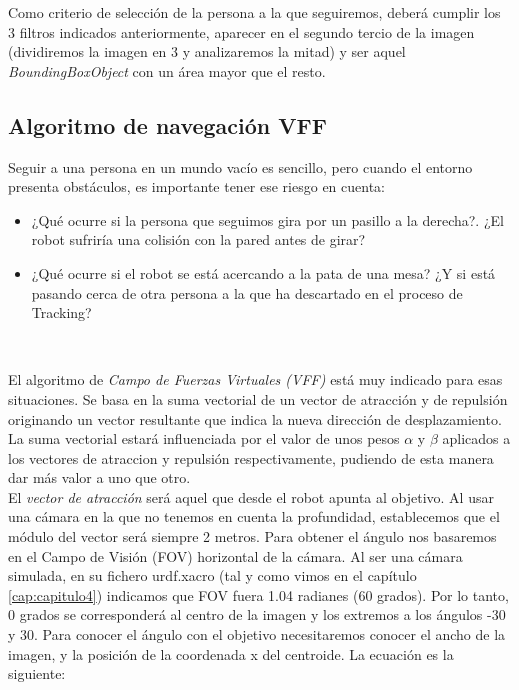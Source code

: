 Como criterio de selección de la persona a la que seguiremos, deberá cumplir los 3 filtros indicados anteriormente, aparecer en el segundo tercio de la imagen (dividiremos la imagen en 3 y analizaremos la mitad) y ser aquel \textit{BoundingBoxObject} con un área mayor que el resto.\\


\subsection{Algoritmo de navegación VFF}
\label{subsec:vff}

Seguir a una persona en un mundo vacío es sencillo, pero cuando el entorno presenta obstáculos, es importante tener ese riesgo en cuenta:\\

\begin{itemize}
	\item ¿Qué ocurre si la persona que seguimos gira por un pasillo a la derecha?. ¿El robot sufriría una colisión con la pared antes de girar?
	\item ¿Qué ocurre si el robot se está acercando a la pata de una mesa? ¿Y si está pasando cerca de otra persona a la que ha descartado en el proceso de Tracking?
\end{itemize}\

El algoritmo de \textit{Campo de Fuerzas Virtuales (VFF)} está muy indicado para esas situaciones. Se basa en la suma vectorial de un vector de atracción y de repulsión originando un vector resultante que indica la nueva dirección de desplazamiento. La suma vectorial estará influenciada por el valor de unos pesos $\alpha$ y $\beta$ aplicados a los vectores de atraccion y repulsión respectivamente, pudiendo de esta manera dar más valor a uno que otro.\\

El \textit{vector de atracción} será aquel que desde el robot apunta al objetivo. Al usar una cámara en la que no tenemos en cuenta la profundidad, establecemos que el módulo del vector será siempre 2 metros. Para obtener el ángulo nos basaremos en el Campo de Visión (FOV) horizontal de la cámara. Al ser una cámara simulada, en su fichero urdf.xacro (tal y como vimos en el capítulo \ref{cap:capitulo4}) indicamos que FOV fuera 1.04 radianes (60 grados). Por lo tanto, 0 grados se corresponderá al centro de la imagen y los extremos a los ángulos -30 y 30. Para conocer el ángulo con el objetivo necesitaremos conocer el ancho de la imagen, y la posición de la coordenada x del centroide. La ecuación es la siguiente:

